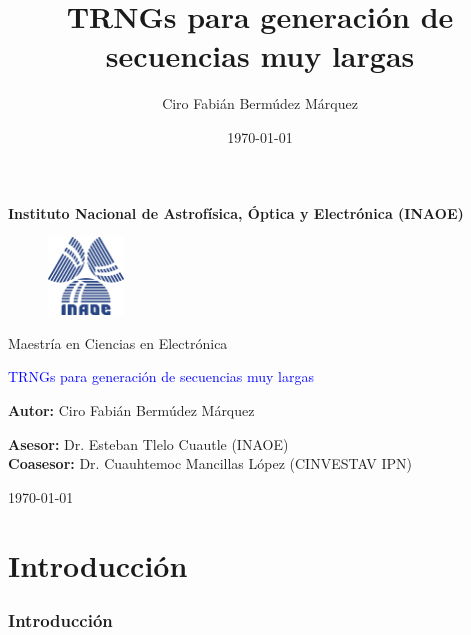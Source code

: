 \documentclass[10pt]{beamer}
\author{Ciro Fabián Bermúdez Márquez}
\title{TRNGs para generación de secuencias muy largas}
\institute{Instituto Nacional de Astrofísica, Óptica y Electrónica}
\date{\today}
\begin{document}
\begin{frame}[plain]
    \selectfont
	\begin{center}
		\textbf{Instituto Nacional de Astrofísica, Óptica y Electrónica (INAOE)}
	\end{center}
	
	\begin{figure}[hbtp]
		\centering
		\includegraphics[width = 2cm]{Inaoe} 
	\end{figure}
	
	\begin{center}
		Maestría en Ciencias en Electrónica
	\end{center}
					
	\begin{center}
		\begin{Large}
		\textcolor{blue}{TRNGs para generación de secuencias muy largas}
		\end{Large}
	\end{center}
	
	\begin{center}
		\textbf{Autor:} Ciro Fabián Bermúdez Márquez
	\end{center}
	
	\begin{flushleft}
		\textbf{Asesor:} Dr. Esteban Tlelo Cuautle (INAOE)\\
	    \textbf{Coasesor:} Dr. Cuauhtemoc Mancillas López (CINVESTAV IPN)
	\end{flushleft}
	
	\begin{flushright}
	    \today
	\end{flushright}
\end{frame}

\begin{frame}
    \tableofcontents
\end{frame}

\section{Introducción}


\begin{frame}
    \frametitle{Introducción}
    \begin{block}{}
        \justifying
	\end{block}
\end{frame}
\end{document}
